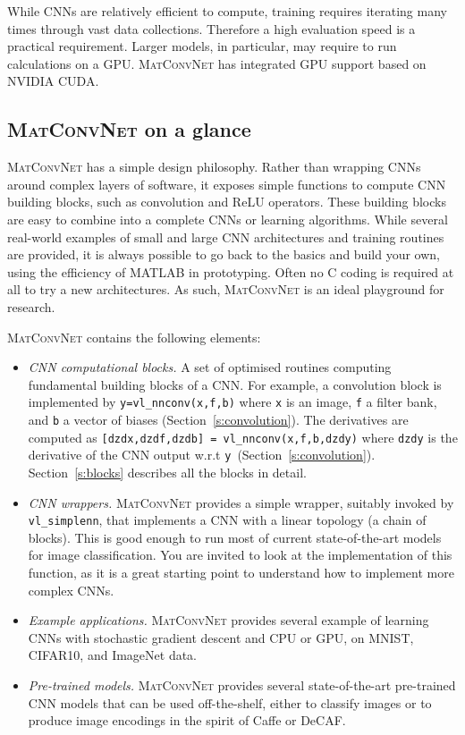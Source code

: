 \documentclass[12pt]{article}
\newcommand{\vlnn}{\textsc{MatConvNet}\xspace}
\begin{document}
While CNNs are relatively efficient to compute, training requires iterating many times through vast data collections. Therefore a high evaluation speed is a practical requirement. Larger models, in particular, may require to run calculations on a GPU. \vlnn has integrated GPU support based on NVIDIA CUDA.

\subsection{\vlnn on a glance}\label{s:vlnn}

\vlnn has a simple design philosophy. Rather than wrapping CNNs around complex layers of software, it exposes simple functions to compute CNN building blocks, such as convolution and ReLU operators. These building blocks are easy to combine into a complete CNNs or learning algorithms. While several real-world examples of small and large CNN architectures and training routines are provided, it is always possible to go back to the basics and build your own, using the efficiency of MATLAB in prototyping. Often no C coding is required at all to try a new architectures. As such, \vlnn is an ideal playground for research.

\vlnn contains the following elements:
\begin{itemize}
\item \emph{CNN computational blocks.} A set of optimised routines computing fundamental building blocks of a CNN. For example, a convolution block is implemented by \linebreak \verb!y=vl_nnconv(x,f,b)! where \verb!x! is an image, \verb!f! a filter bank, and \verb!b! a vector of biases (Section~\ref{s:convolution}). The derivatives are computed as
\verb![dzdx,dzdf,dzdb] = vl_nnconv(x,f,b,dzdy)! where \verb!dzdy! is the derivative of the CNN output w.r.t \verb!y!~(Section~\ref{s:convolution}). Section~\ref{s:blocks} describes all the blocks in detail.
\item \emph{CNN wrappers.} \vlnn provides a simple wrapper, suitably invoked by \verb!vl_simplenn!, that implements a CNN with a linear topology (a chain of blocks). This is good enough to run most of current state-of-the-art models for image classification. You are invited to look at the implementation of this function, as it is a great starting point to understand how to implement more complex CNNs.
\item \emph{Example applications.} \vlnn provides several example of learning CNNs with stochastic gradient descent and CPU or GPU, on MNIST, CIFAR10, and ImageNet data.
\item \emph{Pre-trained models.} \vlnn provides several state-of-the-art pre-trained CNN models that can be used off-the-shelf, either to classify images or to produce image encodings in the spirit of Caffe or DeCAF.
\end{itemize}
\end{document}
